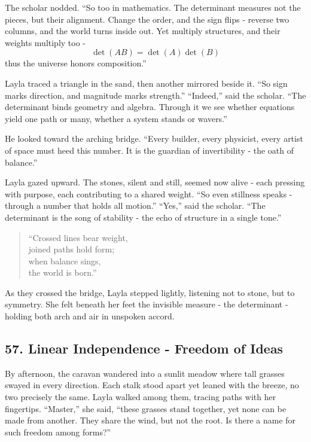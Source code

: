 \documentclass[
  letterpaper,
  DIV=11,
  numbers=noendperiod]{scrreprt}
\begin{document}
The scholar nodded. ``So too in mathematics. The determinant measures
not the pieces, but their alignment. Change the order, and the sign
flips - reverse two columns, and the world turns inside out. Yet
multiply structures, and their weights multiply too - \[
\det(AB) = \det(A)\det(B)
\] thus the universe honors composition.''

Layla traced a triangle in the sand, then another mirrored beside it.
``So sign marks direction, and magnitude marks strength.'' ``Indeed,''
said the scholar. ``The determinant binds geometry and algebra. Through
it we see whether equations yield one path or many, whether a system
stands or wavers.''

He looked toward the arching bridge. ``Every builder, every physicist,
every artist of space must heed this number. It is the guardian of
invertibility - the oath of balance.''

Layla gazed upward. The stones, silent and still, seemed now alive -
each pressing with purpose, each contributing to a shared weight. ``So
even stillness speaks - through a number that holds all motion.''
``Yes,'' said the scholar. ``The determinant is the song of stability -
the echo of structure in a single tone.''

\begin{quote}
``Crossed lines bear weight,\\
joined paths hold form;\\
when balance sings,\\
the world is born.''
\end{quote}

As they crossed the bridge, Layla stepped lightly, listening not to
stone, but to symmetry. She felt beneath her feet the invisible measure
- the determinant - holding both arch and air in unspoken accord.

\subsection{57. Linear Independence - Freedom of
Ideas}\label{linear-independence---freedom-of-ideas}

By afternoon, the caravan wandered into a sunlit meadow where tall
grasses swayed in every direction. Each stalk stood apart yet leaned
with the breeze, no two precisely the same. Layla walked among them,
tracing paths with her fingertips. ``Master,'' she said, ``these grasses
stand together, yet none can be made from another. They share the wind,
but not the root. Is there a name for such freedom among forms?''
\end{document}
